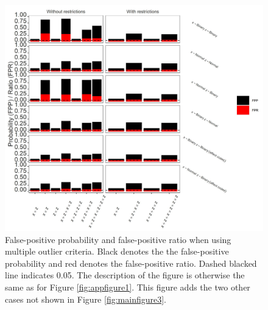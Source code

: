 \begin{figure}[ht!]
\includegraphics[width=1\textwidth]{R/Analysis/Result/Figures/Figure1BSI.jpeg}
\centering
\caption{False-positive probability and false-positive ratio when using multiple outlier criteria. Black denotes the the false-positive probability and red denotes the false-positive ratio. Dashed blacked line indicates 0.05. The description of the figure is otherwise the same as for Figure \ref{fig:appfigure1}. This figure adds the two other cases not shown in Figure \ref{fig:mainfigure3}.
}
\label{fig:appfigure4}
\end{figure}

